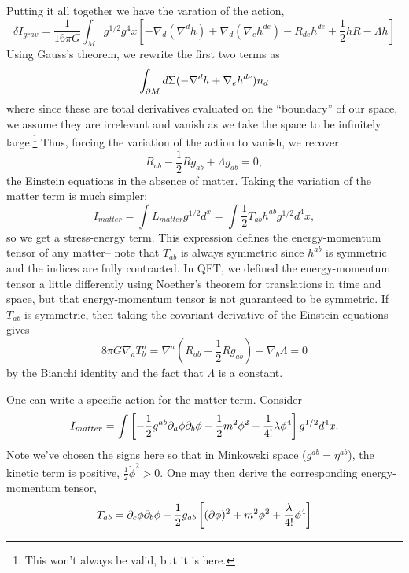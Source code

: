 Putting it all together we have the varation of the action,
$$
\delta I_{grav}=\frac{1}{16\pi G} \int_M g^{1/2} g^4 x \left[-\nabla_d (\nabla^d h) +\nabla_d (\nabla_e h^{de}) - R_{de} h^{de} +\frac{1}{2} h R - \Lambda h\right]$$
Using Gauss's theorem, we rewrite the first two terms as
$$\int_{\partial M}d \Sigma (-\nabla^d h + \nabla_e h^{de})n_d$$
where since these are total derivatives evaluated on the ``boundary'' of our space, we assume they are irrelevant and vanish as we take the space to be infinitely large.\footnote{This won't always be valid, but it is here.} Thus, forcing the variation of the action to vanish, we recover
$$R_{ab}-\frac{1}{2}R g_{ab}+\Lambda g_{ab}=0,$$
the Einstein equations in the absence of matter. Taking the variation of the matter term is much simpler:
$$I_{matter}=\int L_{matter} g^{1/2}d^x = \int \frac{1}{2} T_{ab} h^{ab} g^{1/2} d^4x,$$
so we get a stress-energy term. This expression defines the energy-momentum tensor of any matter-- note that $T_{ab}$ is always symmetric since $h^{ab}$ is symmetric and the indices are fully contracted. In QFT, we defined the energy-momentum tensor a little differently using Noether's theorem for translations in time and space, but that energy-momentum tensor is not guaranteed to be symmetric. If $T_{ab}$ is symmetric, then taking the covariant derivative of the Einstein equations gives
$$8\pi G \nabla_a T^a_b= \nabla^a(R_{ab}-\frac{1}{2} R g_{ab})+\nabla_b \Lambda = 0$$
by the Bianchi identity and the fact that $\Lambda$ is a constant.

\begin{exm}
One can write a specific action for the matter term. Consider
$$I_{matter}=\int \left[-\frac{1}{2} g^{ab}\partial_a \phi \partial_b \phi-\frac{1}{2} m^2 \phi^2 -\frac{1}{4!} \lambda \phi^4 \right] g^{1/2} d^4x.$$
Note we've chosen the signs here so that in Minkowski space ($g^{ab}=\eta^{ab}$), the kinetic term is positive, $\frac{1}{2} \dot \phi^2 >0.$ One may then derive the corresponding energy-momentum tensor,
$$T_{ab}=\partial_c \phi \partial_b \phi -\frac{1}{2} g_{ab} \left[(\partial\phi)^2+m^2\phi^2+\frac{\lambda}{4!}\phi^4\right]$$
\end{exm}